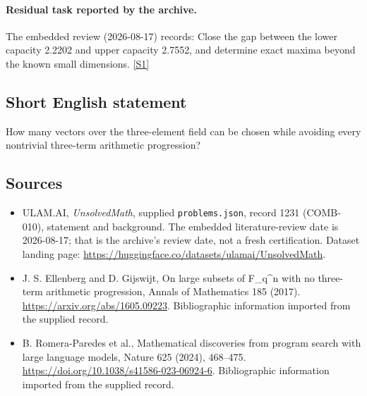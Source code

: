 \documentclass[11pt,a4paper]{article}
\newcommand{\sref}[2]{\hyperlink{source:#1:#2}{[S#2]}}
\begin{document}
\paragraph{Residual task reported by the archive.}

The embedded review (2026-08-17) records: Close the gap between the lower capacity 2.2202 and upper capacity 2.7552, and determine exact maxima beyond the known small dimensions. \sref{1231}{1}

\subsection{Short English statement}

How many vectors over the three-element field can be chosen while avoiding every nontrivial three-term arithmetic progression?

\subsection{Sources}

{\small

\begin{itemize}

\item[\hypertarget{source:1231:1}{S1}] ULAM.AI, \emph{UnsolvedMath}, supplied \texttt{problems.json}, record 1231 (COMB-010), statement and background. The embedded literature-review date is 2026-08-17; that is the archive’s review date, not a fresh certification. Dataset landing page: \url{https://huggingface.co/datasets/ulamai/UnsolvedMath}.

\item[\hypertarget{source:1231:2}{S2}] J. S. Ellenberg and D. Gijswijt, On large subsets of F\_q\textasciicircum{}n with no three-term arithmetic progression, Annals of Mathematics 185 (2017). \url{https://arxiv.org/abs/1605.09223}. Bibliographic information imported from the supplied record.

\item[\hypertarget{source:1231:3}{S3}] B. Romera-Paredes et al., Mathematical discoveries from program search with large language models, Nature 625 (2024), 468–475. \url{https://doi.org/10.1038/s41586-023-06924-6}. Bibliographic information imported from the supplied record.

\end{itemize}

}

\label{end:1231}
\end{document}
